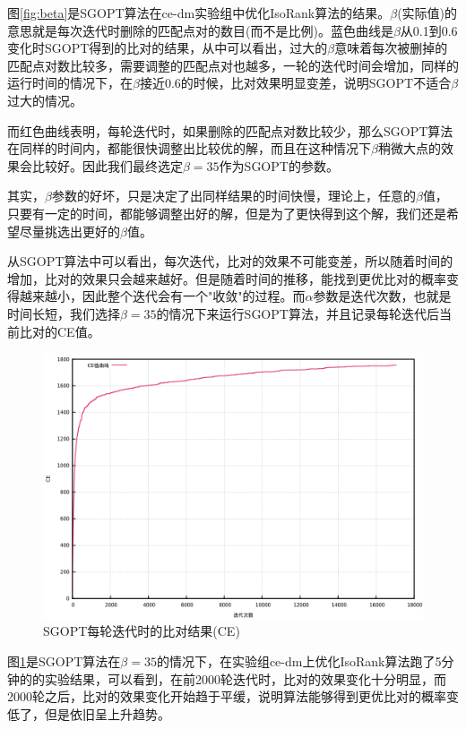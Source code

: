 图\ref{fig:beta}是SGOPT算法在ce-dm实验组中优化IsoRank算法的结果。$\beta$(实际值)的意思就是每次迭代时删除的匹配点对的数目(而不是比例)。蓝色曲线是$\beta$从0.1到0.6变化时SGOPT得到的比对的结果，从中可以看出，过大的$\beta$意味着每次被删掉的匹配点对数比较多，需要调整的匹配点对也越多，一轮的迭代时间会增加，同样的运行时间的情况下，在$\beta$接近0.6的时候，比对效果明显变差，说明SGOPT不适合$\beta$过大的情况。

而红色曲线表明，每轮迭代时，如果删除的匹配点对数比较少，那么SGOPT算法在同样的时间内，都能很快调整出比较优的解，而且在这种情况下$\beta$稍微大点的效果会比较好。因此我们最终选定$\beta=35$作为SGOPT的参数。

其实，$\beta$参数的好坏，只是决定了出同样结果的时间快慢，理论上，任意的$\beta$值，只要有一定的时间，都能够调整出好的解，但是为了更快得到这个解，我们还是希望尽量挑选出更好的$\beta$值。

从SGOPT算法中可以看出，每次迭代，比对的效果不可能变差，所以随着时间的增加，比对的效果只会越来越好。但是随着时间的推移，能找到更优比对的概率变得越来越小，因此整个迭代会有一个"收敛"的过程。而$\alpha$参数是迭代次数，也就是时间长短，我们选择$\beta=35$的情况下来运行SGOPT算法，并且记录每轮迭代后当前比对的CE值。

\begin{figure}[htbp]
\centering
\includegraphics[height=0.4\textheight]{pic/alpha.png}
\caption{SGOPT每轮迭代时的比对结果(CE)} 
\label{fig:alpha}
\end{figure}

图\ref{fig:alpha}是SGOPT算法在$\beta=35$的情况下，在实验组ce-dm上优化IsoRank算法跑了5分钟的的实验结果，可以看到，在前2000轮迭代时，比对的效果变化十分明显，而2000轮之后，比对的效果变化开始趋于平缓，说明算法能够得到更优比对的概率变低了，但是依旧呈上升趋势。

